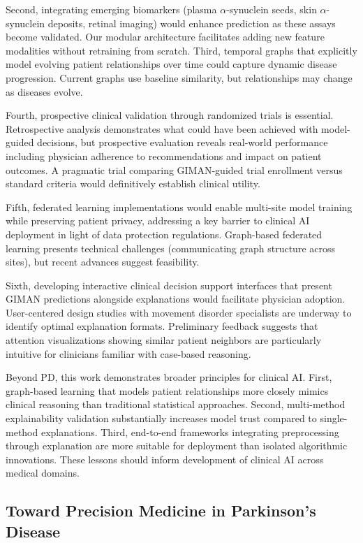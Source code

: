 Second, integrating emerging biomarkers (plasma $\alpha$-synuclein seeds, skin $\alpha$-synuclein deposits, retinal imaging) would enhance prediction as these assays become validated. Our modular architecture facilitates adding new feature modalities without retraining from scratch. Third, temporal graphs that explicitly model evolving patient relationships over time could capture dynamic disease progression. Current graphs use baseline similarity, but relationships may change as diseases evolve.

Fourth, prospective clinical validation through randomized trials is essential. Retrospective analysis demonstrates what could have been achieved with model-guided decisions, but prospective evaluation reveals real-world performance including physician adherence to recommendations and impact on patient outcomes. A pragmatic trial comparing GIMAN-guided trial enrollment versus standard criteria would definitively establish clinical utility.

Fifth, federated learning implementations would enable multi-site model training while preserving patient privacy, addressing a key barrier to clinical AI deployment in light of data protection regulations. Graph-based federated learning presents technical challenges (communicating graph structure across sites), but recent advances suggest feasibility.

Sixth, developing interactive clinical decision support interfaces that present GIMAN predictions alongside explanations would facilitate physician adoption. User-centered design studies with movement disorder specialists are underway to identify optimal explanation formats. Preliminary feedback suggests that attention visualizations showing similar patient neighbors are particularly intuitive for clinicians familiar with case-based reasoning.

Beyond PD, this work demonstrates broader principles for clinical AI. First, graph-based learning that models patient relationships more closely mimics clinical reasoning than traditional statistical approaches. Second, multi-method explainability validation substantially increases model trust compared to single-method explanations. Third, end-to-end frameworks integrating preprocessing through explanation are more suitable for deployment than isolated algorithmic innovations. These lessons should inform development of clinical AI across medical domains.

\subsection{Toward Precision Medicine in Parkinson's Disease}

